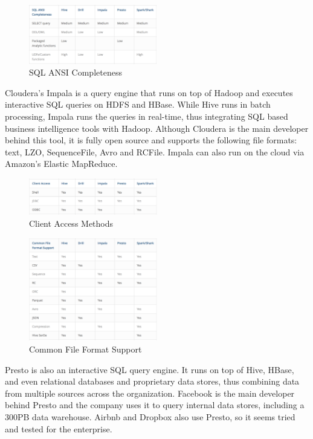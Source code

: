 \documentclass[twocolumn]{article}
\begin{document}
\begin{figure}[htb]
        \centering
        \includegraphics[width=0.5\textwidth]{dst02}
        \caption{SQL ANSI Completeness}
        \label{dst02}
\end{figure}

Cloudera's Impala is a query engine that runs on top of Hadoop and executes interactive SQL queries on HDFS and HBase. While Hive runs in batch processing, Impala runs the queries in real-time, thus integrating SQL based business intelligence tools with Hadoop. Although Cloudera is the main developer behind this tool, it is fully open source and supports the following file formats:  text, LZO, SequenceFile, Avro and RCFile. Impala can also run on the cloud via Amazon’s Elastic MapReduce.

\begin{figure}[htb]
        \centering
        \includegraphics[width=0.5\textwidth]{dst03}
        \caption{Client Access Methods}
        \label{dst03}
\end{figure}

\begin{figure}[htb]
        \centering
        \includegraphics[width=0.5\textwidth]{dst04}
        \caption{Common File Format Support}
        \label{dst04}
\end{figure}

Presto is also an interactive SQL query engine. It runs on top of Hive, HBase, and even relational databases and proprietary data stores, thus combining data from multiple sources across the organization. Facebook is the main developer behind Presto and the company uses it to query internal data stores, including a 300PB data warehouse. Airbnb and Dropbox also use Presto, so it seems tried and tested for the enterprise.
\end{document}
